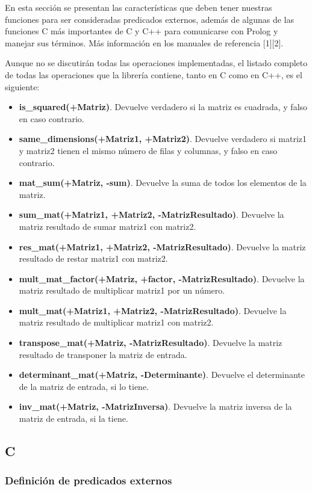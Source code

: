 \documentclass[a4paper,12pt]{article}
\begin{document}
En esta sección se presentan las características que deben tener nuestras funciones para ser consideradas predicados externos, además de algunas de las funciones C más importantes de C y C++ para comunicarse con Prolog y manejar sus términos. Más información en los manuales de referencia [1][2].

Aunque no se discutirán todas las operaciones implementadas, el listado completo de todas las operaciones que la librería contiene, tanto en C como en C++, es el siguiente:

\begin{itemize}
\item \textbf{is\_squared(+Matriz)}. Devuelve verdadero si la matriz es cuadrada, y falso en caso contrario.
\item \textbf{same\_dimensions(+Matriz1, +Matriz2)}. Devuelve verdadero si matriz1 y matriz2 tienen el mismo número de filas y columnas, y falso en caso contrario.
\item \textbf{mat\_sum(+Matriz, -sum)}. Devuelve la suma de todos los elementos de la matriz.
\item \textbf{sum\_mat(+Matriz1, +Matriz2, -MatrizResultado)}. Devuelve la matriz resultado de sumar matriz1 con matriz2.
\item \textbf{res\_mat(+Matriz1, +Matriz2, -MatrizResultado)}. Devuelve la matriz resultado de restar matriz1 con matriz2.
\item \textbf{mult\_mat\_factor(+Matriz, +factor, -MatrizResultado)}. Devuelve la matriz resultado de multiplicar matriz1 por un número.
\item \textbf{mult\_mat(+Matriz1, +Matriz2, -MatrizResultado)}. Devuelve la matriz resultado de multiplicar matriz1 con matriz2.
\item \textbf{transpose\_mat(+Matriz, -MatrizResultado)}. Devuelve la matriz resultado de transponer la matriz de entrada.
\item \textbf{determinant\_mat(+Matriz, -Determinante)}. Devuelve el determinante de la matriz de entrada, si lo tiene.
\item \textbf{inv\_mat(+Matriz, -MatrizInversa)}. Devuelve la matriz inversa de la matriz de entrada, si la tiene.
\end{itemize}
\subsection{C}
\subsubsection{Definición de predicados externos}
\end{document}
